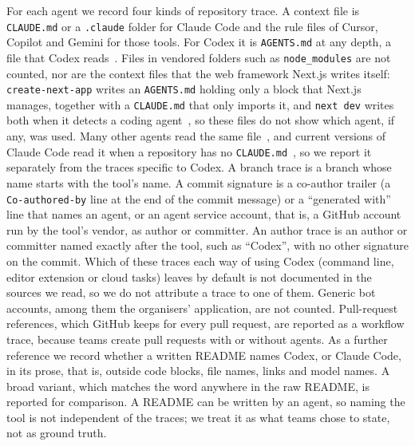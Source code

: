 \documentclass{article}
\begin{document}
For each agent we record four kinds of repository trace. A context file is \texttt{CLAUDE.md} or a \texttt{.claude} folder for Claude Code and the rule files of Cursor, Copilot and Gemini for those tools. For Codex it is \texttt{AGENTS.md} at any depth, a file that Codex reads~\cite{openai2026agentsmd}. Files in vendored folders such as \texttt{node\_modules} are not counted, nor are the context files that the web framework Next.js writes itself: \texttt{create-next-app} writes an \texttt{AGENTS.md} holding only a block that Next.js manages, together with a \texttt{CLAUDE.md} that only imports it, and \texttt{next dev} writes both when it detects a coding agent~\cite{nextjs2026agents}, so these files do not show which agent, if any, was used. Many other agents read the same file~\cite{agentsmd2026site}, and current versions of Claude Code read it when a repository has no \texttt{CLAUDE.md}~\cite{claudecode2026memory}, so we report it separately from the traces specific to Codex. A branch trace is a branch whose name starts with the tool's name. A commit signature is a co-author trailer (a \texttt{Co-authored-by} line at the end of the commit message) or a ``generated with'' line that names an agent, or an agent service account, that is, a GitHub account run by the tool's vendor, as author or committer. An author trace is an author or committer named exactly after the tool, such as ``Codex'', with no other signature on the commit. Which of these traces each way of using Codex (command line, editor extension or cloud tasks) leaves by default is not documented in the sources we read, so we do not attribute a trace to one of them. Generic bot accounts, among them the organisers' application, are not counted. Pull-request references, which GitHub keeps for every pull request, are reported as a workflow trace, because teams create pull requests with or without agents. As a further reference we record whether a written README names Codex, or Claude Code, in its prose, that is, outside code blocks, file names, links and model names. A broad variant, which matches the word anywhere in the raw README, is reported for comparison. A README can be written by an agent, so naming the tool is not independent of the traces; we treat it as what teams chose to state, not as ground truth.
\end{document}
